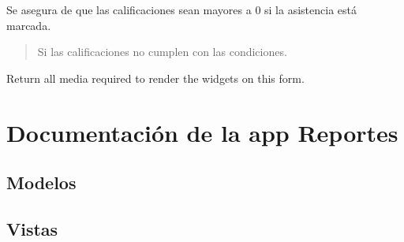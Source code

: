 \documentclass[letterpaper,10pt,spanish]{sphinxmanual}
\begin{document}
\begin{fulllineitems}
\begin{fulllineitems}
\sphinxAtStartPar
Se asegura de que las calificaciones sean mayores a 0 si la asistencia está marcada.
\begin{quote}\begin{description}
\sphinxAtStartPar
{} \textendash{} Si las calificaciones no cumplen con las condiciones.

\end{description}\end{quote}

\end{fulllineitems}



\begin{fulllineitems}

\pysigstartsignatures
{}
\pysigstopsignatures
\end{fulllineitems}



\begin{fulllineitems}

\pysigstartsignatures
{}
\pysigstopsignatures
\sphinxAtStartPar
Return all media required to render the widgets on this form.

\end{fulllineitems}


\end{fulllineitems}


\sphinxstepscope


\chapter{Documentación de la app Reportes}
\label{\detokenize{reportes:documentacion-de-la-app-reportes}}\label{\detokenize{reportes::doc}}

\section{Modelos}
\label{\detokenize{reportes:modelos}}

\section{Vistas}
\label{\detokenize{reportes:vistas}}
\end{document}

